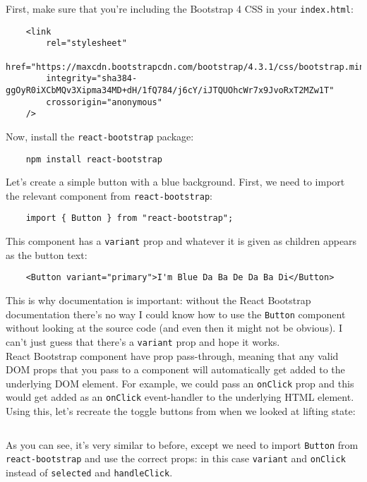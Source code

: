 First, make sure that you're including the Bootstrap 4 CSS in your \texttt{index.html}:

\begin{verbatim}
    <link
        rel="stylesheet"
        href="https://maxcdn.bootstrapcdn.com/bootstrap/4.3.1/css/bootstrap.min.css"
        integrity="sha384-ggOyR0iXCbMQv3Xipma34MD+dH/1fQ784/j6cY/iJTQUOhcWr7x9JvoRxT2MZw1T"
        crossorigin="anonymous"
    />
\end{verbatim}

Now, install the \texttt{react-bootstrap} package:

\begin{verbatim}
    npm install react-bootstrap
\end{verbatim}

Let's create a simple button with a blue background. First, we need to import the relevant component from \texttt{react-bootstrap}:

\begin{verbatim}
    import { Button } from "react-bootstrap";
\end{verbatim}

This component has a \texttt{variant} prop and whatever it is given as children appears as the button text:

\begin{verbatim}
    <Button variant="primary">I'm Blue Da Ba De Da Ba Di</Button>
\end{verbatim}

This is why documentation is important: without the React Bootstrap documentation there's no way I could know how to use the \texttt{Button} component without looking at the source code (and even then it might not be obvious). I can't just guess that there's a \texttt{variant} prop and hope it works.
\\

React Bootstrap component have prop pass-through, meaning that any valid DOM props that you pass to a component will automatically get added to the underlying DOM element. For example, we could pass an \texttt{onClick} prop and this would get added as an \texttt{onClick} event-handler to the underlying HTML element.
\\

Using this, let's recreate the toggle buttons from when we looked at lifting state:

\inputminted{js}{06/figures/01/01-Buttons.js}

As you can see, it's very similar to before, except we need to import \texttt{Button} from \texttt{react-bootstrap} and use the correct props: in this case \texttt{variant} and \texttt{onClick} instead of \texttt{selected} and \texttt{handleClick}.
\\

